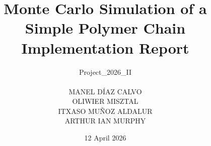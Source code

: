 \documentclass[11pt, a4paper]{article}
\begin{document}
\title{\textbf{Monte Carlo Simulation of a Simple Polymer Chain}\\
       \large Implementation Report}
\author{Project\_2026\_II\\
        \\
        MANEL DÍAZ CALVO\\
        OLIWIER MISZTAL\\
        ITXASO MUÑOZ ALDALUR\\
        ARTHUR IAN MURPHY}
\date{12 April 2026}
\maketitle
\tableofcontents
\newpage
















\end{document}
